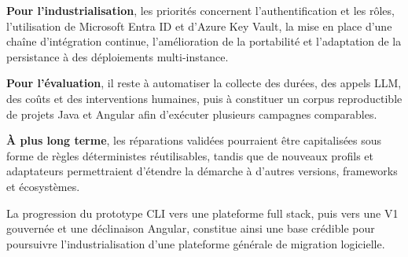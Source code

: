 \textbf{Pour l'industrialisation}, les priorités concernent l'authentification et les rôles, l'utilisation de Microsoft Entra ID et d'Azure Key Vault, la mise en place d'une chaîne d'intégration continue, l'amélioration de la portabilité et l'adaptation de la persistance à des déploiements multi-instance.

\textbf{Pour l'évaluation}, il reste à automatiser la collecte des durées, des appels LLM, des coûts et des interventions humaines, puis à constituer un corpus reproductible de projets Java et Angular afin d'exécuter plusieurs campagnes comparables.

\textbf{À plus long terme}, les réparations validées pourraient être capitalisées sous forme de règles déterministes réutilisables, tandis que de nouveaux profils et adaptateurs permettraient d'étendre la démarche à d'autres versions, frameworks et écosystèmes.

La progression du prototype CLI vers une plateforme full stack, puis vers une V1 gouvernée et une déclinaison Angular, constitue ainsi une base crédible pour poursuivre l'industrialisation d'une plateforme générale de migration logicielle.
